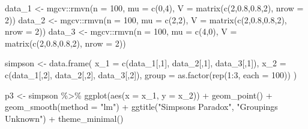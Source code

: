 \documentclass[
  12pt,
]{book}
\newenvironment{Shaded}{\begin{snugshade}}{\end{snugshade}}
\newcommand{\AttributeTok}[1]{\textcolor[rgb]{0.77,0.63,0.00}{#1}}
\newcommand{\DecValTok}[1]{\textcolor[rgb]{0.00,0.00,0.81}{#1}}
\newcommand{\FloatTok}[1]{\textcolor[rgb]{0.00,0.00,0.81}{#1}}
\newcommand{\FunctionTok}[1]{\textcolor[rgb]{0.00,0.00,0.00}{#1}}
\newcommand{\NormalTok}[1]{#1}
\newcommand{\OtherTok}[1]{\textcolor[rgb]{0.56,0.35,0.01}{#1}}
\newcommand{\SpecialCharTok}[1]{\textcolor[rgb]{0.00,0.00,0.00}{#1}}
\newcommand{\StringTok}[1]{\textcolor[rgb]{0.31,0.60,0.02}{#1}}
\begin{document}
\begin{Shaded}
\begin{Highlighting}[]
\NormalTok{data\_1 }\OtherTok{\textless{}{-}}\NormalTok{ mgcv}\SpecialCharTok{::}\FunctionTok{rmvn}\NormalTok{(}\AttributeTok{n =} \DecValTok{100}\NormalTok{, }\AttributeTok{mu =} \FunctionTok{c}\NormalTok{(}\DecValTok{0}\NormalTok{,}\DecValTok{4}\NormalTok{), }\AttributeTok{V =} \FunctionTok{matrix}\NormalTok{(}\FunctionTok{c}\NormalTok{(}\DecValTok{2}\NormalTok{,}\FloatTok{0.8}\NormalTok{,}\FloatTok{0.8}\NormalTok{,}\DecValTok{2}\NormalTok{), }\AttributeTok{nrow =} \DecValTok{2}\NormalTok{))}
\NormalTok{data\_2 }\OtherTok{\textless{}{-}}\NormalTok{ mgcv}\SpecialCharTok{::}\FunctionTok{rmvn}\NormalTok{(}\AttributeTok{n =} \DecValTok{100}\NormalTok{, }\AttributeTok{mu =} \FunctionTok{c}\NormalTok{(}\DecValTok{2}\NormalTok{,}\DecValTok{2}\NormalTok{), }\AttributeTok{V =} \FunctionTok{matrix}\NormalTok{(}\FunctionTok{c}\NormalTok{(}\DecValTok{2}\NormalTok{,}\FloatTok{0.8}\NormalTok{,}\FloatTok{0.8}\NormalTok{,}\DecValTok{2}\NormalTok{), }\AttributeTok{nrow =} \DecValTok{2}\NormalTok{))}
\NormalTok{data\_3 }\OtherTok{\textless{}{-}}\NormalTok{ mgcv}\SpecialCharTok{::}\FunctionTok{rmvn}\NormalTok{(}\AttributeTok{n =} \DecValTok{100}\NormalTok{, }\AttributeTok{mu =} \FunctionTok{c}\NormalTok{(}\DecValTok{4}\NormalTok{,}\DecValTok{0}\NormalTok{), }\AttributeTok{V =} \FunctionTok{matrix}\NormalTok{(}\FunctionTok{c}\NormalTok{(}\DecValTok{2}\NormalTok{,}\FloatTok{0.8}\NormalTok{,}\FloatTok{0.8}\NormalTok{,}\DecValTok{2}\NormalTok{), }\AttributeTok{nrow =} \DecValTok{2}\NormalTok{))}

\NormalTok{simpson }\OtherTok{\textless{}{-}} \FunctionTok{data.frame}\NormalTok{(}
  \AttributeTok{x\_1 =} \FunctionTok{c}\NormalTok{(data\_1[,}\DecValTok{1}\NormalTok{], data\_2[,}\DecValTok{1}\NormalTok{], data\_3[,}\DecValTok{1}\NormalTok{]), }
  \AttributeTok{x\_2 =} \FunctionTok{c}\NormalTok{(data\_1[,}\DecValTok{2}\NormalTok{], data\_2[,}\DecValTok{2}\NormalTok{], data\_3[,}\DecValTok{2}\NormalTok{]),}
  \AttributeTok{group =} \FunctionTok{as.factor}\NormalTok{(}\FunctionTok{rep}\NormalTok{(}\DecValTok{1}\SpecialCharTok{:}\DecValTok{3}\NormalTok{, }\AttributeTok{each =} \DecValTok{100}\NormalTok{))}
\NormalTok{)}

\NormalTok{p3 }\OtherTok{\textless{}{-}}\NormalTok{ simpson }\SpecialCharTok{\%\textgreater{}\%} 
  \FunctionTok{ggplot}\NormalTok{(}\FunctionTok{aes}\NormalTok{(}\AttributeTok{x =}\NormalTok{ x\_1, }\AttributeTok{y =}\NormalTok{ x\_2)) }\SpecialCharTok{+}
  \FunctionTok{geom\_point}\NormalTok{() }\SpecialCharTok{+} 
  \FunctionTok{geom\_smooth}\NormalTok{(}\AttributeTok{method =} \StringTok{"lm"}\NormalTok{) }\SpecialCharTok{+} 
  \FunctionTok{ggtitle}\NormalTok{(}\StringTok{"Simpson\textquotesingle{}s Paradox"}\NormalTok{, }\StringTok{"Groupings Unknown"}\NormalTok{) }\SpecialCharTok{+}
  \FunctionTok{theme\_minimal}\NormalTok{()}


\end{Highlighting}
\end{Shaded}
\end{document}
